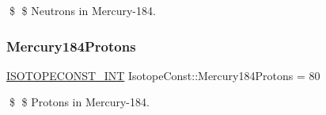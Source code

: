 \$ \$ Neutrons in Mercury-\/184. \mbox{\label{group___isotope_const-_mercury-_hg184_ga4a623967d28d9d81a230a5ed5b1d9223}} 
\subsubsection{\texorpdfstring{Mercury184\+Protons}{Mercury184Protons}}
{\footnotesize\ttfamily \mbox{\hyperlink{group___isotope_const-_macros_ga5f18360b3e99483a35c32d789e62621c}{I\+S\+O\+T\+O\+P\+E\+C\+O\+N\+S\+T\+\_\+\+I\+NT}} Isotope\+Const\+::\+Mercury184\+Protons = 80}

\$ \$ Protons in Mercury-\/184. 